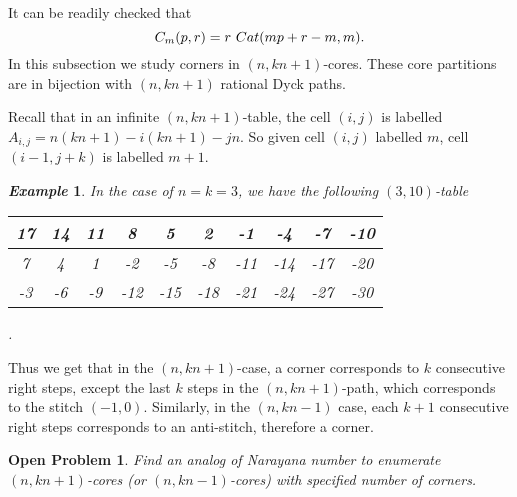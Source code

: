 \documentclass[a4paper,12pt]{article}
\def \remark {\noindent \emph{Remark. }}
\newtheorem{openproblem}[thm]{Open Problem}
\newtheorem{exam}[thm]{\it Example}
\begin{document}
It can be readily checked that  $$C_m(p,r) = r\tiny{\enskip}Cat(mp+r-m,m).$$
In this subsection we study corners in $(n,kn+1)$-cores. These core partitions are in bijection with $(n,kn+1)$ rational Dyck paths.

%
Recall that in an infinite  $(n,kn+1)$-table, the cell $(i,j)$ is labelled $A_{i,j} = n(kn+1)-i(kn+1)-jn$. So given cell $(i,j)$ labelled $m$, cell $(i-1,j+k)$ is labelled $m+1$.

\begin{exam}
  In the case of $n=k=3$, we have the following $(3,10)$-table
\begin{center}
  \begin{tabular}{|c|c|c|c|c|c|c|c|c|c|}
    \hline
    17 & 14 & 11 & 8 & 5 & 2 & -1 & -4 & -7 & -10 \\ \hline
    7 & 4 & 1 & -2 & -5 & -8 & -11 & -14 & -17 & -20 \\ \hline
    -3 & -6 & -9 & -12 & -15 & -18 & -21 & -24 & -27 & -30 \\ \hline
  \end{tabular}.
  \end{center}
\end{exam}

Thus we get that in the $(n,kn+1)$-case, a corner corresponds to  $k$ consecutive right steps, except the last $k$ steps in the  $(n,kn+1)$-path, which corresponds to the stitch $(-1,0)$.
 Similarly, in the $(n,kn-1)$ case, each $k+1$ consecutive right steps corresponds to an anti-stitch, therefore a corner.


\begin{openproblem}
  Find an analog of Narayana number to enumerate $(n,kn+1)$-cores (or $(n,kn-1)$-cores)  with specified number of corners.
\end{openproblem}



\end{document}
